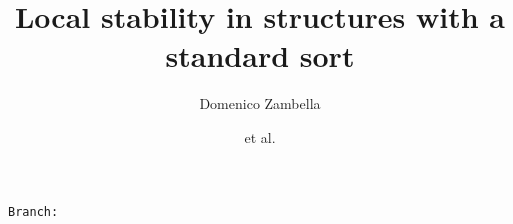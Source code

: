 \documentclass{amsproc}
\author{Domenico Zambella}
\author{et al.}
\newcommand\branch{}
\begin{document}
\title{Local stability in structures with a standard sort}
\hfill\texttt{Branch:\ \branch\ \DTMnow}
\maketitle
\raggedbottom

\begin{abstract}

\end{abstract}


\section{}

\def\ceq#1#2#3{\parbox[t]{23ex}{$\displaystyle #1$}\parbox{6ex}{\hfil $#2$}{$\displaystyle #3$}}

\newcommand\biburl[1]{\url{#1}}
\end{document}
